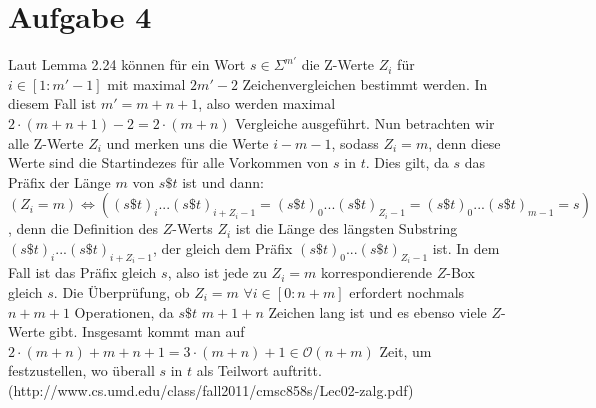 \documentclass[a4paper,10pt,oneside,leqno]{scrartcl}
\begin{document}
\section*{Aufgabe 4}%
Laut Lemma 2.24 können für ein Wort $s\in \Sigma^{m'}$ die Z-Werte $Z_i$ für $i\in [1 : m'-1]$ mit
maximal $2m'-2$ Zeichenvergleichen bestimmt werden. In diesem Fall ist $m'=m+n+1$, also werden maximal $2\cdot(m+n+1)-2 = 2\cdot(m+n)$ Vergleiche
ausgeführt. Nun betrachten wir alle Z-Werte $Z_i$ und merken uns die Werte $i-m-1$, sodass $Z_i=m$, denn diese Werte sind die Startindezes für alle
Vorkommen von $s$ in $t$. Dies gilt, da $s$ das Präfix der Länge $m$ von $s\$t$ ist und dann: $(Z_i = m) \Leftrightarrow ((s\$t)_i...(s\$t)_{i+Z_i-1} = (s\$t)_0...(s\$t)_{Z_i-1}= (s\$t)_0...(s\$t)_{m-1} = s)$,
denn die Definition des $Z$-Werts $Z_i$ ist die Länge des längsten Substring $(s\$t)_i...(s\$t)_{i+Z_i-1}$, der gleich dem Präfix $(s\$t)_0...(s\$t)_{Z_i-1}$ ist.
In dem Fall ist das Präfix gleich $s$, also ist jede zu $Z_i=m$ korrespondierende $Z$-Box gleich $s$.
\newline Die Überprüfung, ob $Z_i=m$  $\forall i\in[0:n+m]$ erfordert nochmals $n+m+1$ Operationen, da $s\$t$ $m+1+n$ Zeichen lang ist und es ebenso viele $Z$-Werte gibt.
Insgesamt kommt man auf $2\cdot(m+n)+m+n+1 = 3\cdot(m+n)+1\in \mathcal{O}(n+m)$ Zeit, um festzustellen, wo überall $s$ in $t$ als Teilwort auftritt.
(http://www.cs.umd.edu/class/fall2011/cmsc858s/Lec02-zalg.pdf)
\end{document}

